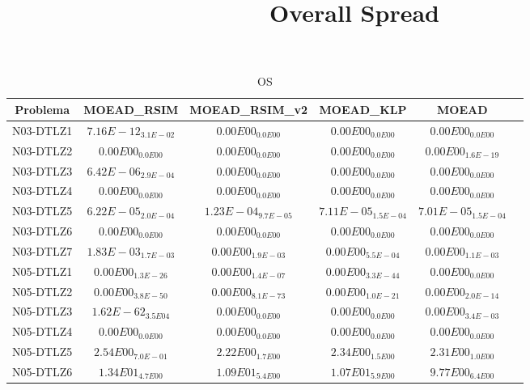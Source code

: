 \documentclass{article}
\title{Overall Spread}
\author{}
\begin{document}
\maketitle
\begin{table*}[ht!]
\scriptsize
\caption{OS}
\centering\begin{tabular}{|c||c||c||c||c||c|} \hline
Problema &MOEAD_RSIM &MOEAD_RSIM_v2 &MOEAD_KLP &MOEAD\\\hline
N03-DTLZ1 &\cellcolor{gray95}$7.16E-12_{3.1E-02}$ &\cellcolor{gray25}$0.00E00_{0.0E00}$ &$0.00E00_{0.0E00}$ &$0.00E00_{0.0E00}$\\ 
\hline
N03-DTLZ2 &\cellcolor{gray95}$0.00E00_{0.0E00}$ &\cellcolor{gray25}$0.00E00_{0.0E00}$ &$0.00E00_{0.0E00}$ &$0.00E00_{1.6E-19}$\\ 
\hline
N03-DTLZ3 &\cellcolor{gray95}$6.42E-06_{2.9E-04}$ &\cellcolor{gray25}$0.00E00_{0.0E00}$ &$0.00E00_{0.0E00}$ &$0.00E00_{0.0E00}$\\ 
\hline
N03-DTLZ4 &\cellcolor{gray95}$0.00E00_{0.0E00}$ &\cellcolor{gray25}$0.00E00_{0.0E00}$ &$0.00E00_{0.0E00}$ &$0.00E00_{0.0E00}$\\ 
\hline
N03-DTLZ5 &$6.22E-05_{2.0E-04}$ &\cellcolor{gray95}$1.23E-04_{9.7E-05}$ &\cellcolor{gray25}$7.11E-05_{1.5E-04}$ &$7.01E-05_{1.5E-04}$\\ 
\hline
N03-DTLZ6 &\cellcolor{gray95}$0.00E00_{0.0E00}$ &\cellcolor{gray25}$0.00E00_{0.0E00}$ &$0.00E00_{0.0E00}$ &$0.00E00_{0.0E00}$\\ 
\hline
N03-DTLZ7 &\cellcolor{gray95}$1.83E-03_{1.7E-03}$ &$0.00E00_{1.9E-03}$ &\cellcolor{gray25}$0.00E00_{5.5E-04}$ &$0.00E00_{1.1E-03}$\\ 
\hline
N05-DTLZ1 &$0.00E00_{1.3E-26}$ &$0.00E00_{1.4E-07}$ &\cellcolor{gray25}$0.00E00_{3.3E-44}$ &\cellcolor{gray95}$0.00E00_{0.0E00}$\\ 
\hline
N05-DTLZ2 &\cellcolor{gray25}$0.00E00_{3.8E-50}$ &\cellcolor{gray95}$0.00E00_{8.1E-73}$ &$0.00E00_{1.0E-21}$ &$0.00E00_{2.0E-14}$\\ 
\hline
N05-DTLZ3 &\cellcolor{gray95}$1.62E-62_{3.5E04}$ &\cellcolor{gray25}$0.00E00_{0.0E00}$ &$0.00E00_{0.0E00}$ &$0.00E00_{3.4E-03}$\\ 
\hline
N05-DTLZ4 &\cellcolor{gray95}$0.00E00_{0.0E00}$ &\cellcolor{gray25}$0.00E00_{0.0E00}$ &$0.00E00_{0.0E00}$ &$0.00E00_{0.0E00}$\\ 
\hline
N05-DTLZ5 &\cellcolor{gray95}$2.54E00_{7.0E-01}$ &$2.22E00_{1.7E00}$ &\cellcolor{gray25}$2.34E00_{1.5E00}$ &$2.31E00_{1.0E00}$\\ 
\hline
N05-DTLZ6 &\cellcolor{gray95}$1.34E01_{4.7E00}$ &\cellcolor{gray25}$1.09E01_{5.4E00}$ &$1.07E01_{5.9E00}$ &$9.77E00_{6.4E00}$\\ 

\end{tabular}
\end{table*}
\end{document}
